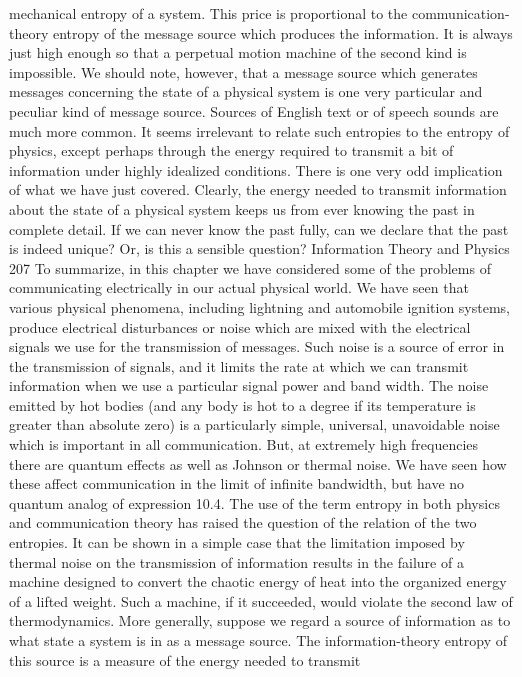{{{{{{{{{{{mechanical entropy of a system. This price is proportional to the
communication-theory entropy of the message source which produces
the information. It is always just high enough so that a
perpetual motion machine of the second kind is impossible.
We should note, however, that a message source which generates
messages concerning the state of a physical system is one very
particular and peculiar kind of message source. Sources of English
text or of speech sounds are much more common. It seems irrelevant
to relate such entropies to the entropy of physics, except
perhaps through the energy required to transmit a bit of information
under highly idealized conditions.
There is one very odd implication of what we have just covered.
Clearly, the energy needed to transmit information about the state
of a physical system keeps us from ever knowing the past in complete
detail. If we can never know the past fully, can we declare
that the past is indeed unique? Or, is this a sensible question?
Information Theory and Physics
207
To summarize, in this chapter we have considered some of the
problems of communicating electrically in our actual physical
world. We have seen that various physical phenomena, including
lightning and automobile ignition systems, produce electrical disturbances
or noise which are mixed with the electrical signals we
use for the transmission of messages. Such noise is a source of
error in the transmission of signals, and it limits the rate at which
we can transmit information when we use a particular signal power
and band width.
The noise emitted by hot bodies (and any body is hot to a degree
if its temperature is greater than absolute zero) is a particularly
simple, universal, unavoidable noise which is important in all communication.
But, at extremely high frequencies there are quantum
effects as well as Johnson or thermal noise. We have seen how
these affect communication in the limit of infinite bandwidth, but
have no quantum analog of expression 10.4.
The use of the term entropy in both physics and communication
theory has raised the question of the relation of the two entropies.
It can be shown in a simple case that the limitation imposed by
thermal noise on the transmission of information results in the
failure of a machine designed to convert the chaotic energy of heat
into the organized energy of a lifted weight. Such a machine, if it
succeeded, would violate the second law of thermodynamics. More
generally, suppose we regard a source of information as to what
state a system is in as a message source. The information-theory
entropy of this source is a measure of the energy needed to transmit
}}}}}}}}}}}
